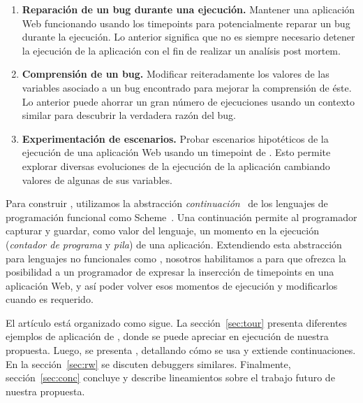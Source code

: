 \documentclass[conference]{IEEEtran}
\begin{document}
\begin{enumerate}

	\item {\bf Reparaci\'on de un bug durante una ejecuci\'on.} Mantener una aplicaci\'on Web funcionando usando los timepoints para potencialmente reparar un bug durante la ejecuci\'on. Lo anterior significa que no es siempre necesario detener la ejecuci\'on de la aplicaci\'on con el fin de realizar un anal\'isis post mortem.  

	\smallskip
	
	\item {\bf Comprensi\'on de un bug.} Modificar reiteradamente los valores de las variables asociado a un bug encontrado para mejorar la comprensi\'on de \'este. Lo anterior puede ahorrar un gran n\'umero de ejecuciones usando un contexto similar para descubrir la verdadera raz\'on del bug.

	\smallskip

	\item {\bf Experimentaci\'on de escenarios.} Probar escenarios hipot\'eticos de la ejecuci\'on de una aplicaci\'on Web usando un timepoint de \deloreanjs. Esto permite explorar diversas evoluciones de la ejecuci\'on de la aplicaci\'on cambiando valores de algunas de sus variables.
   
\end{enumerate}


Para construir \deloreanjs, utilizamos la abstracci\'on {\em continuaci\'on}~\cite{fw84} de los lenguajes de programaci\'on funcional como Scheme~\cite{scheme48}. Una continuaci\'on permite al programador capturar y guardar, como valor del lenguaje, un momento en la ejecuci\'on ({\em contador de programa} y {\em pila}) de una aplicaci\'on. Extendiendo esta abstracci\'on para lenguajes no funcionales como \javascript, nosotros habilitamos a \deloreanjs para que ofrezca la posibilidad a un programador de expresar la insercci\'on de timepoints en una aplicaci\'on Web,  y as\'i poder volver esos momentos de ejecuci\'on y modificarlos cuando es requerido.   


El art\'iculo est\'a organizado como sigue. La secci\'on~\ref{sec:tour} presenta diferentes ejemplos de aplicaci\'on de \deloreanjs, donde se puede apreciar en ejecuci\'on de nuestra propuesta. Luego, se presenta \deloreanjs, detallando c\'omo se usa y extiende continuaciones. En la secci\'on~\ref{sec:rw} se discuten debuggers similares. Finalmente, secci\'on~\ref{sec:conc} concluye y describe lineamientos sobre el trabajo futuro de nuestra propuesta.      
\end{document}
